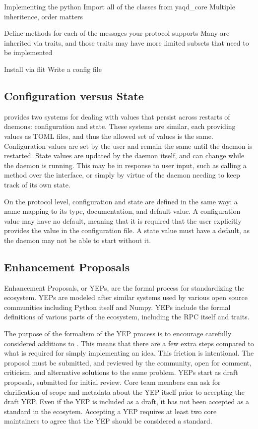Implementing the python
Import all of the classes from yaqd_core
Multiple inheritence, order matters

Define methods for each of the messages your protocol supports
Many are inherited via traits, and those traits may have more limited subsets that need to be implemented


Install via flit
Write a config file


\subsection{Configuration versus State}

\yaq{} provides two systems for dealing with values that persist across restarts of daemons: configuration and state.
These systems are similar, each providing values as TOML files, and thus the allowed set of values is the same.
Configuration values are set by the user and remain the same until the daemon is restarted.
State values are updated by the daemon itself, and can change while the daemon is running.
This may be in response to user input, such as calling a method over the \yaq{} interface, or simply by virtue of the daemon needing to keep track of its own state.

On the protocol level, configuration and state are defined in the same way: a name mapping to its type, documentation, and default value.
A configuration value may have no default, meaning that it is required that the user explicitly provides the value in the configuration file.
A state value must have a default, as the daemon may not be able to start without it.

\subsection{\yaq{} Enhancement Proposals}

\yaq{} Enhancement Proposals, or YEPs, are the formal process for standardizing the \yaq{} ecosystem.
YEPs are modeled after similar systems used by various open source communities including Python itself\cite{} and Numpy\cite{}.
YEPs include the formal definitions of various parts of the \yaq{} ecosystem, including the RPC itself and traits.

The purpose of the formalism of the YEP process is to encourage carefully considered additions to \yaq{}.
This means that there are a few extra steps compared to what is required for simply implementing an idea.
This friction is intentional.
The proposol must be submitted, and reviewed by the community, open for comment, criticism, and alternative solutions to the same problem.
YEPs start as draft proposals, submitted for initial review.
Core team members can ask for clarification of scope and metadata about the YEP itself prior to accepting the draft YEP.
Even if the YEP is included as a draft, it has not been accepted as a standard in the \yaq{} ecosytem.
Accepting a YEP requires at least two core maintainers to agree that the YEP should be considered a standard.

